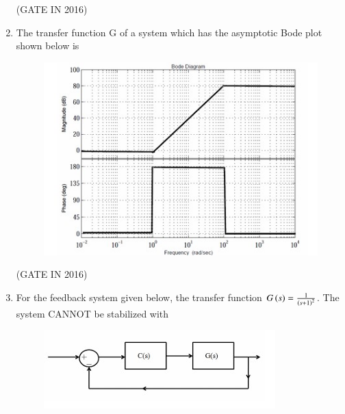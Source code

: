 \documentclass[journal,12pt,onecolumn]{IEEEtran}
\theoremstyle{remark}
\begin{document}
\begin{enumerate}
\hfill{(GATE IN 2016)}

\item The transfer function G of a system which has the asymptotic Bode plot shown below is
\begin{figure}[H]
\centering
\includegraphics[width=1\columnwidth]{figs/z17.jpg}
\caption*{}
\label{fig:z17}
\end{figure}

\hfill{(GATE IN 2016)}
\begin{enumerate}
\end{enumerate}

\item For the feedback system given below, the transfer function $G\left(s\right) = \frac{1}{\left(s+1\right)^2}$. The system CANNOT be stabilized with
\begin{figure}[H]
\centering
\includegraphics[width=0.6\columnwidth]{figs/z18.jpg}
\caption*{}
\label{fig:z18}
\end{figure}


\end{enumerate}
\end{document}

